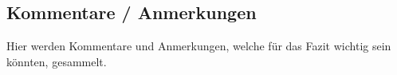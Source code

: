 
\begin{flushleft}
    \clearpage
    \recalctypearea
    \section{Kommentare / Anmerkungen}
    \begin{flushleft}
        Hier werden Kommentare und Anmerkungen, welche für das Fazit wichtig sein könnten, gesammelt.
        
    \end{flushleft}
\end{flushleft}

